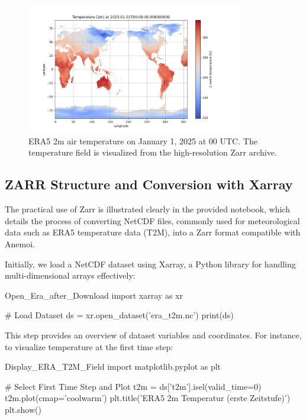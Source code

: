 %
\begin{figure}[htbp]
    \centering
    \includegraphics[width=0.85\textwidth]{images/era_t2m_2025_01_01_00.png}
    \caption{ERA5 2m air temperature on January 1, 2025 at 00 UTC. The temperature field is visualized from the high-resolution Zarr archive.}
    \label{fig:era_t2m_2025_01_01_00}
\end{figure}

%
\subsection{ZARR Structure and Conversion with Xarray}

The practical use of Zarr is illustrated clearly in the provided notebook, which details the process of converting NetCDF files, commonly used for meteorological data such as ERA5 temperature data (T2M), into a Zarr format compatible with Anemoi.

Initially, we load a NetCDF dataset using Xarray, a Python library for handling multi-dimensional arrays effectively:

\begin{codeonly}{Open\_Era\_after\_Download}
import xarray as xr

# Load Dataset
ds = xr.open_dataset('era_t2m.nc')
print(ds)
\end{codeonly}

This step provides an overview of dataset variables and coordinates. For instance, to visualize temperature at the first time step:

\begin{codeonly}{Display\_ERA\_T2M\_Field}
import matplotlib.pyplot as plt

# Select First Time Step and Plot
t2m = ds['t2m'].isel(valid_time=0)
t2m.plot(cmap='coolwarm')
plt.title('ERA5 2m Temperatur (erste Zeitstufe)')
plt.show()
\end{codeonly}

